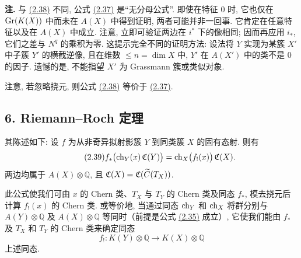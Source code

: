 \textbf{注.} 与 \hyperlink{sga6.e00.eq.2-38}{(2.38)} 不同, 公式 \hyperlink{sga6.e00.eq.2-37}{(2.37)} 是“无分母公式”. 即使在特征 $0$ 时, 它也仅在 $\operatorname{Gr}(K(X))$ 中而未在 $A(X)$ 中得到证明, 两者可能并非一回事. 它肯定在任意特征以及在 $A(X)$ 中成立. 注意, 立即可验证两边在 $i^*$ 下的像相同; 因而再应用 $i_*$, 它们之差与 $N^q$ 的乘积为零. 这提示完全不同的证明方法: 设法将 $Y$ 实现为某簇 $X'$ 中子簇 $Y'$ 的横截逆像, 且在维数 $\leq n=\dim X$ 中, $Y'$ 在 $A(X')$ 中的类不是 $0$ 的因子. 遗憾的是, 不能指望 $X'$ 为 Grassmann 簇或类似对象.

注意, 若忽略挠元, 则公式 \hyperlink{sga6.e00.eq.2-38}{(2.38)} 等价于 \hyperlink{sga6.e00.eq.2-37}{(2.37)}.




\providecommand{\cS}{\mathcal S}
\providecommand{\cD}{\mathcal D}
\providecommand{\cE}{\mathscr E}
\providecommand{\cG}{\mathscr G}
\providecommand{\cL}{\mathscr L}
\providecommand{\cM}{\mathscr M}
\providecommand{\cP}{\mathscr P}
\providecommand{\cK}{\mathcal K}
\providecommand{\Db}{\mathrm D}
\providecommand{\Kb}{\mathrm K}
\providecommand{\Trc}{\operatorname{Tr}}
\providecommand{\ob}{\operatorname{ob}}
\providecommand{\Coh}{\operatorname{Coh}}
\providecommand{\Cone}{\operatorname{Cone}}
\providecommand{\im}{\operatorname{Im}}
\providecommand{\Id}{\operatorname{Id}}
\providecommand{\RR}{\mathrm{R.R.}}
\providecommand{\RRR}{\mathrm{R.R.R.}}
\providecommand{\GrR}{\mathrm{G}}
\providecommand{\pr}{\operatorname{pr}}


\subsection*{6. Riemann--Roch 定理}

其陈述如下: 设 \(f\) 为从非奇异拟射影簇 \(Y\) 到同类簇 \(X\) 的固有态射. 则有
\begin{equation}\tag{2.39}
 f_*\bigl(\operatorname{ch}_Y(x)\,\mathfrak C(Y)\bigr)
 =
 \operatorname{ch}_X\bigl(f_!(x)\bigr)\,\mathfrak C(X).
\end{equation}
两边均属于 \(A(X)\otimes \mathbb Q\), 且 \(\mathfrak C(X)=\mathfrak C(\widetilde C(T_X))\).

此公式使我们可由 \(x\) 的 Chern 类、\(T_X\) 与 \(T_Y\) 的 Chern 类及同态 \(f_*\), 模去挠元后计算 \(f_!(x)\) 的 Chern 类. 或等价地, 当通过同态 \(\operatorname{ch}_Y\) 和 \(\operatorname{ch}_X\) 将群分别与 \(A(Y)\otimes \mathbb Q\) 及 \(A(X)\otimes \mathbb Q\) 等同时（前提是公式 \hyperlink{sga6.e00.eq.2-35}{(2.35)} 成立）, 它使我们能由 \(f_*\) 及 \(T_X\) 和 \(T_Y\) 的 Chern 类来确定同态
\[
  f_!:K(Y)\otimes \mathbb Q \longrightarrow K(X)\otimes \mathbb Q
\]
上述同态.

